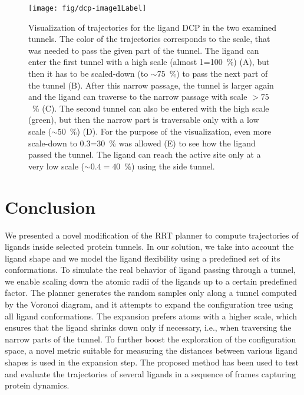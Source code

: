 \documentclass[usletter, 10pt, conference]{ieeeconf} %
\begin{document}
\begin{figure}
\centering
\texttt{[image: fig/dcp-image1Label]}\\
\vspace{-3mm}
\caption{\label{fig::dcp}
    \small
Visualization of trajectories for the ligand DCP in the two examined tunnels.  
The color of the trajectories corresponds to the scale, that was needed to pass the given part of the tunnel.
The ligand can enter the first tunnel with a high scale (almost 1=100~\%) (A), but then it has to be scaled-down (to $\sim75$~\%) to pass the
next part of the tunnel (B). After this narrow passage, the tunnel is larger again and the ligand can traverse to the narrow passage with
scale $>75$~\% (C).
The second tunnel can also be entered with the high scale (green), but then the narrow part is traversable only with a low scale ($\sim50$~\%) (D). 
For the purpose of the visualization, even more scale-down to 0.3=30~\% was allowed (E) to see how the ligand passed the tunnel.
The ligand can reach the active site only at a very low scale ($\sim0.4=40$~\%) using the side tunnel.
}
\end{figure}


\section{Conclusion}

We presented a novel modification of the RRT planner to compute trajectories of ligands inside selected protein tunnels.
In our solution, we take into account the ligand shape and we model the ligand flexibility using a predefined set of its conformations.
To simulate the real behavior of ligand passing through a tunnel, we enable scaling down the atomic radii of the ligands up to a certain predefined factor.
The planner generates the random samples only along a tunnel computed by the Voronoi diagram, and it attempts to expand the configuration
tree using all ligand conformations. 
The expansion prefers atoms with a higher scale, which ensures that the ligand shrinks down only if necessary, i.e., when traversing the narrow parts of the tunnel.
To further boost the exploration of the configuration space, a novel metric suitable for measuring the distances between various ligand shapes is used in the expansion step.
The proposed method has been used to test and evaluate the trajectories of several ligands in a sequence of frames capturing protein dynamics.




\end{document}
